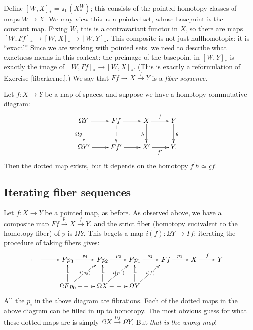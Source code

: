 Define $[W,X]_\ast = \pi_0(X^W_\ast)$; this consists of the pointed homotopy classes of maps $W\to X$.
We may view this as a pointed set, whose basepoint is the constant map.
Fixing $W$, this is a contravariant functor in $X$, so there are maps $[W,Ff]_\ast\to [W,X]_\ast\to [W,Y]_\ast$.
This composite is not just nullhomotopic: it is ``exact''!
Since we are working with pointed sets, we need to describe what exactness means in this context:
the preimage of the basepoint in $[W,Y]_\ast$ is exactly the image of $[W,Ff]_\ast\to [W,X]_\ast$.
(This is exactly a reformulation of Exercise \ref{fiberkernel}.)
We say that $Ff\to X\xrightarrow{f}Y$ is a \emph{fiber sequence}.

\begin{remark}
    Let $f:X\to Y$ be a map of spaces, and suppose we have a homotopy commutative diagram:
    \begin{equation*}
	\xymatrix{
	    \Omega Y\ar[d]_{\Omega g}\ar[r] & Ff\ar@{-->}[d]\ar[r] & X\ar[d]_{h}\ar[r]^f & Y\ar[d]^g\\
	    \Omega Y^\prime\ar[r] & Ff^\prime\ar[r] & X^\prime\ar[r]_{f^\prime} & Y.
	    }
    \end{equation*}
    Then the dotted map exists, but it {depends on the homotopy} $f^\prime h\simeq gf$. 
\end{remark}

\subsection{Iterating fiber sequences}
Let $f:X\to Y$ be a pointed map, as before.
As observed above, we have a composite map $Ff\xrightarrow{p} X\xrightarrow{f} Y$, and
the strict fiber (homotopy euqivalent to the homotopy fiber) of $p$ is $\Omega Y$.
This begets a map $i(f):\Omega Y\to Ff$; iterating the procedure of taking fibers gives:
\begin{equation*}
    \xymatrix{
	\cdots\ar[r] & Fp_3 \ar[r]^{p_4} & Fp_2\ar[r]^{p_3} & Fp_1\ar[r]^{p_2} & Ff\ar[r]^{p_1} & X\ar[r]^{f} & Y\\
	& \Omega Fp_0\ar[u]|{\simeq}\ar[ur]|{i(p_2)}\ar@{-->}[r] & \Omega X\ar@{-->}[r]\ar[u]|{\simeq}\ar[ur]|{i(p_1)} & \Omega Y\ar[u]|\simeq \ar[ur]|{i(f)} & &
    }
\end{equation*}
All the $p_i$ in the above diagram are fibrations.
Each of the dotted maps in the above diagram can be filled in up to homotopy.
The most obvious guess for what these dotted maps are is simply $\Omega X\xrightarrow{\Omega f}\Omega Y$.
But \emph{that is the wrong map}!

